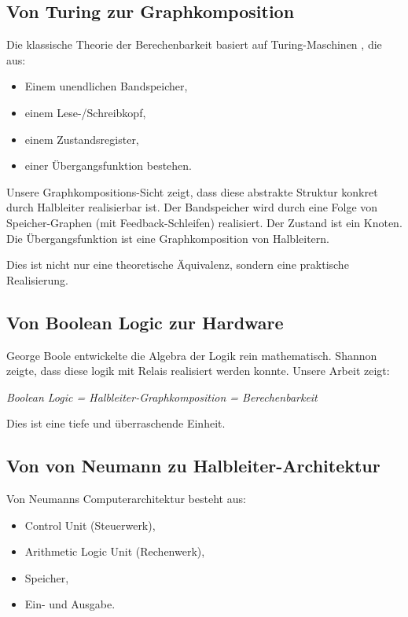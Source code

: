 \documentclass[12pt, a4paper]{article}
\theoremstyle{definition}
\theoremstyle{remark}
\begin{document}
\subsection{Von Turing zur Graphkomposition}
\label{subsec:turing_zur_graph}

Die klassische Theorie der Berechenbarkeit basiert auf Turing-Maschinen \cite{turing1936}, die aus:
\begin{itemize}
  \item Einem unendlichen Bandspeicher,
  \item einem Lese-/Schreibkopf,
  \item einem Zustandsregister,
  \item einer Übergangsfunktion bestehen.
\end{itemize}

Unsere Graphkompositions-Sicht zeigt, dass diese abstrakte Struktur konkret durch Halbleiter realisierbar ist. Der Bandspeicher wird durch eine Folge von Speicher-Graphen (mit Feedback-Schleifen) realisiert. Der Zustand ist ein Knoten. Die Übergangsfunktion ist eine Graphkomposition von Halbleitern.

Dies ist nicht nur eine theoretische Äquivalenz, sondern eine praktische Realisierung.

\subsection{Von Boolean Logic zur Hardware}
\label{subsec:boolean_zu_hardware}

George Boole \cite{boole1854} entwickelte die Algebra der Logik rein mathematisch. Shannon \cite{shannon1938} zeigte, dass diese logik mit Relais realisiert werden konnte. Unsere Arbeit zeigt:

\begin{center}
\textit{Boolean Logic = Halbleiter-Graphkomposition = Berechenbarkeit}
\end{center}

Dies ist eine tiefe und überraschende Einheit.

\subsection{Von von Neumann zu Halbleiter-Architektur}
\label{subsec:von_neumann_halbleiter}

Von Neumanns Computerarchitektur \cite{neumann1945} besteht aus:
\begin{itemize}
  \item Control Unit (Steuerwerk),
  \item Arithmetic Logic Unit (Rechenwerk),
  \item Speicher,
  \item Ein- und Ausgabe.
\end{itemize}
\end{document}
